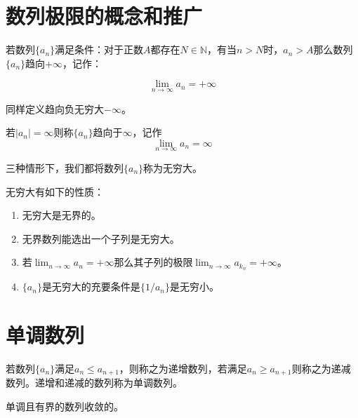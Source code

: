 
\section{数列极限的概念和推广}

\begin{definition}[正无穷大]
	若数列\(\{a_n\}\)满足条件：对于正数\(A\)都存在\(N\in \mathbb N\)，有当\(n>N\)时，\(a_n > A\)那么数列\(\{a _ n\}\)趋向\(+\infty\)，记作：
	
	$$
		\lim_{n\rightarrow \infty}a_n = + \infty
	$$
\end{definition}

同样定义趋向负无穷大\(-\infty\)。

\begin{definition}[无穷大]
	若\(|a_n|=\infty\)则称\(\{a_n\}\)趋向于\(\infty\)，记作\[\lim_{n\rightarrow \infty}a_n=\infty\]
\end{definition}

三种情形下，我们都将数列$\{a_n\}$称为无穷大。

\begin{theorem} 无穷大有如下的性质：

\begin{enumerate}
\def\labelenumi{\textnormal{\arabic{enumi}.}}
\item
  无穷大是无界的。
\item
  无界数列能选出一个子列是无穷大。
\item
  若\(\lim_{n\rightarrow \infty}a_n=+\infty\)那么其子列的极限\(\lim_{n\rightarrow \infty} a_{k_n} = +\infty\)。
\item
  \(\{a_n\}\)是无穷大的充要条件是\(\{1/a_n\}\)是无穷小。
\end{enumerate}

\end{theorem}

\section{单调数列}

\begin{definition}[单调数列、递增、递减]
若数列\(\{a_n\}\)满足\(a_n \le a _ {n+1}\)，则称之为递增数列，若满足\(a_n \ge a _{n+1}\)则称之为递减数列。递增和递减的数列称为单调数列。
\end{definition}

\begin{theorem}
	单调且有界的数列收敛的。\label{thm-monotonic-convergence-principle}
\end{theorem}

